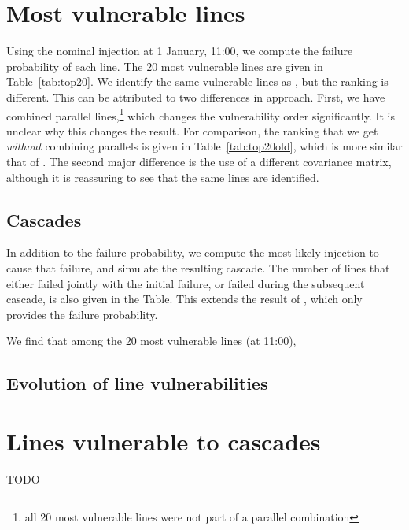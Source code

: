 \documentclass[main.tex]{subfiles}
\begin{document}


\section{Most vulnerable lines}
Using the nominal injection at 1 January, 11:00, we compute the failure probability of each line. The 20 most vulnerable lines are given in Table~\ref{tab:top20}. We identify the same vulnerable lines as \cite{Nesti2018supplemental}, but the ranking is different. This can be attributed to two differences in approach. First, we have combined parallel lines,\footnote{all 20 most vulnerable lines were not part of a parallel combination} which changes the vulnerability order significantly. It is unclear why this changes the result. For comparison, the ranking that we get \emph{without} combining parallels is given in Table~\ref{tab:top20old}, which is more similar that of \cite{Nesti2018supplemental}. The second major difference is the use of a different covariance matrix, although it is reassuring to see that the same lines are identified.

\subsection{Cascades}
In addition to the failure probability, we compute the most likely injection to cause that failure, and simulate the resulting cascade. The number of lines that either failed jointly with the initial failure, or failed during the subsequent cascade, is also given in the Table. This extends the result of \cite{Nesti2018supplemental}, which only provides the failure probability.

We find that among the 20 most vulnerable lines (at 11:00), 


\subsection{Evolution of line vulnerabilities}




\section{Lines vulnerable to cascades}



\begin{table}

\caption{TODO}
\label{tab:top20old}
\end{table}
\end{document}
